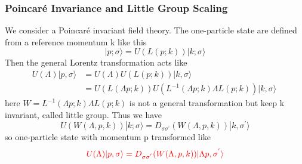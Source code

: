 \documentclass{beamer}
\newcommand{\aket}[1]{|#1\rangle}
\begin{document}
\begin{frame}
    \frametitle{Poincaré Invariance and Little Group Scaling }
    We consider a Poincaré invariant field theory.
    The one-particle state are defined from a reference momentum k like this  
    \begin{equation*}
         \aket{p;\sigma}=U(L(p;k))\aket{k;\sigma}
    \end{equation*}
    Then the general Lorentz transformation acts like
    \begin{align*}
        U(\Lambda)|p,\sigma\rangle &= U(\Lambda) U(L(p;k))|k,\sigma \rangle \\
        &= U(L(\Lambda p;k)) U(L^{-1}(\Lambda p;k) \Lambda L(p;k)) |k,\sigma \rangle\
    \end{align*}
    here $W=L^{-1}(\Lambda p;k) \Lambda L(p;k)$ is not a general transformation but keep k invariant, called little group.
    Thus we have 
    \begin{equation*}
         U(W(\Lambda,p,k))\aket{k;\sigma}=D_{\sigma\sigma^{'}}(W(\Lambda,p,k))\aket{k,\sigma^{'}}
    \end{equation*}
    so one-particle state with momentum p transformed like 
    \begin{equation*}
        \textcolor{red}{U(\Lambda)|p,\sigma\rangle=D_{\sigma\sigma^{'}}(W(\Lambda,p,k))\aket{\Lambda p,\sigma^{'}}}
    \end{equation*}
\end{frame}
\end{document}
